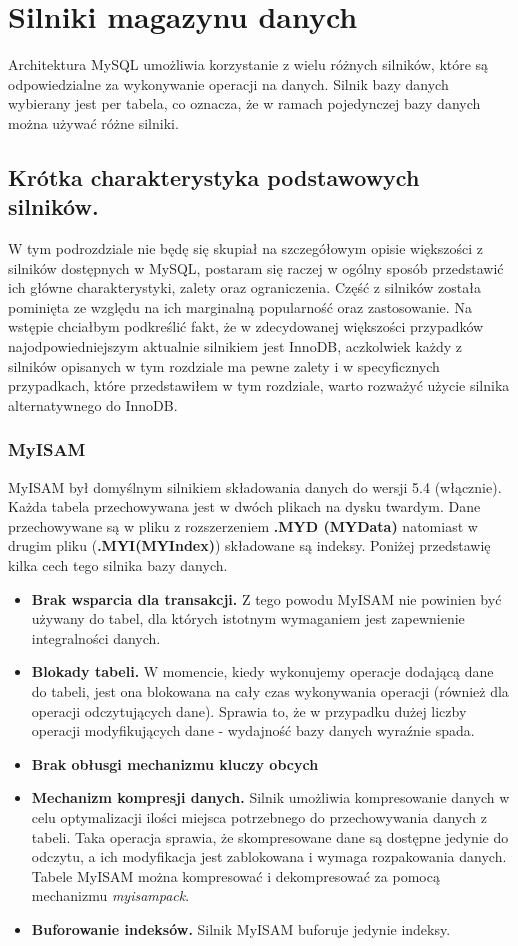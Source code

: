 \section{Silniki magazynu danych}
Architektura MySQL umożliwia korzystanie z wielu różnych silników, które są  odpowiedzialne za wykonywanie operacji na danych. Silnik bazy danych wybierany jest per tabela, co oznacza, że w ramach pojedynczej bazy danych można używać różne silniki.
\subsection{Krótka charakterystyka podstawowych silników.}
W tym podrozdziale nie będę się skupiał na szczegółowym opisie większości z silników dostępnych w MySQL, postaram się raczej w ogólny sposób przedstawić ich główne charakterystyki, zalety oraz ograniczenia. Część z silników została pominięta ze względu na ich marginalną popularność oraz zastosowanie. Na wstępie chciałbym podkreślić fakt, że w zdecydowanej większości przypadków najodpowiedniejszym aktualnie silnikiem jest InnoDB, aczkolwiek każdy z silników opisanych w tym rozdziale ma pewne zalety i w specyficznych przypadkach, które przedstawiłem w tym rozdziale, warto rozważyć użycie silnika alternatywnego do InnoDB.
\subsubsection{MyISAM}
MyISAM był domyślnym silnikiem składowania danych do wersji 5.4 (włącznie). Każda tabela przechowywana jest w dwóch plikach na dysku twardym. Dane przechowywane są w pliku z rozszerzeniem \textbf{.MYD (MYData)}
natomiast w drugim pliku (\textbf{.MYI(MYIndex)}) składowane są indeksy. Poniżej przedstawię kilka cech tego silnika bazy danych. 
\begin{itemize}
	\item \textbf{Brak wsparcia dla transakcji.} Z tego powodu MyISAM nie powinien być używany do tabel, dla których istotnym wymaganiem jest zapewnienie integralności danych.
	\item \textbf{Blokady tabeli.}  W momencie, kiedy wykonujemy operacje dodającą dane do tabeli, jest ona blokowana na cały czas wykonywania operacji (również dla operacji odczytujących dane). Sprawia to, że w przypadku dużej liczby operacji modyfikujących dane - wydajność bazy danych wyraźnie spada.
	\item \textbf{Brak obłusgi mechanizmu kluczy obcych}
	\item \textbf{Mechanizm kompresji danych.} Silnik umożliwia kompresowanie danych w celu optymalizacji ilości miejsca potrzebnego do przechowywania danych z tabeli. Taka operacja sprawia, że skompresowane dane są dostępne jedynie do odczytu, a ich modyfikacja jest zablokowana i wymaga rozpakowania danych. Tabele MyISAM można kompresować i dekompresować za pomocą mechanizmu \textit{myisampack}.
	\item \textbf{Buforowanie indeksów.} Silnik MyISAM buforuje jedynie indeksy.
\end{itemize}

